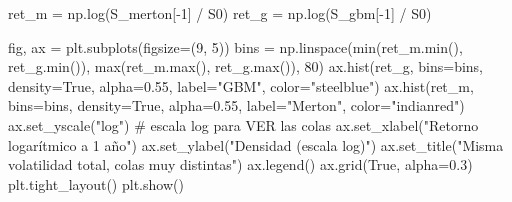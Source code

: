 \documentclass[
  spanish,
  letterpaper,
  DIV=11,
  numbers=noendperiod]{scrreprt}
\newenvironment{Shaded}{\begin{snugshade}}{\end{snugshade}}
\newcommand{\BuiltInTok}[1]{\textcolor[rgb]{0.00,0.23,0.31}{#1}}
\newcommand{\CommentTok}[1]{\textcolor[rgb]{0.37,0.37,0.37}{#1}}
\newcommand{\DecValTok}[1]{\textcolor[rgb]{0.68,0.00,0.00}{#1}}
\newcommand{\FloatTok}[1]{\textcolor[rgb]{0.68,0.00,0.00}{#1}}
\newcommand{\NormalTok}[1]{\textcolor[rgb]{0.00,0.23,0.31}{#1}}
\newcommand{\OperatorTok}[1]{\textcolor[rgb]{0.37,0.37,0.37}{#1}}
\newcommand{\StringTok}[1]{\textcolor[rgb]{0.13,0.47,0.30}{#1}}
\newcommand{\VariableTok}[1]{\textcolor[rgb]{0.07,0.07,0.07}{#1}}
\begin{document}
\begin{Shaded}
\begin{Highlighting}[]
\NormalTok{ret\_m }\OperatorTok{=}\NormalTok{ np.log(S\_merton[}\OperatorTok{{-}}\DecValTok{1}\NormalTok{] }\OperatorTok{/}\NormalTok{ S0)}
\NormalTok{ret\_g }\OperatorTok{=}\NormalTok{ np.log(S\_gbm[}\OperatorTok{{-}}\DecValTok{1}\NormalTok{] }\OperatorTok{/}\NormalTok{ S0)}

\NormalTok{fig, ax }\OperatorTok{=}\NormalTok{ plt.subplots(figsize}\OperatorTok{=}\NormalTok{(}\DecValTok{9}\NormalTok{, }\DecValTok{5}\NormalTok{))}
\NormalTok{bins }\OperatorTok{=}\NormalTok{ np.linspace(}\BuiltInTok{min}\NormalTok{(ret\_m.}\BuiltInTok{min}\NormalTok{(), ret\_g.}\BuiltInTok{min}\NormalTok{()), }\BuiltInTok{max}\NormalTok{(ret\_m.}\BuiltInTok{max}\NormalTok{(), ret\_g.}\BuiltInTok{max}\NormalTok{()), }\DecValTok{80}\NormalTok{)}
\NormalTok{ax.hist(ret\_g, bins}\OperatorTok{=}\NormalTok{bins, density}\OperatorTok{=}\VariableTok{True}\NormalTok{, alpha}\OperatorTok{=}\FloatTok{0.55}\NormalTok{, label}\OperatorTok{=}\StringTok{"GBM"}\NormalTok{, color}\OperatorTok{=}\StringTok{"steelblue"}\NormalTok{)}
\NormalTok{ax.hist(ret\_m, bins}\OperatorTok{=}\NormalTok{bins, density}\OperatorTok{=}\VariableTok{True}\NormalTok{, alpha}\OperatorTok{=}\FloatTok{0.55}\NormalTok{, label}\OperatorTok{=}\StringTok{"Merton"}\NormalTok{, color}\OperatorTok{=}\StringTok{"indianred"}\NormalTok{)}
\NormalTok{ax.set\_yscale(}\StringTok{"log"}\NormalTok{)   }\CommentTok{\# escala log para VER las colas}
\NormalTok{ax.set\_xlabel(}\StringTok{"Retorno logarítmico a 1 año"}\NormalTok{)}
\NormalTok{ax.set\_ylabel(}\StringTok{"Densidad (escala log)"}\NormalTok{)}
\NormalTok{ax.set\_title(}\StringTok{"Misma volatilidad total, colas muy distintas"}\NormalTok{)}
\NormalTok{ax.legend()}
\NormalTok{ax.grid(}\VariableTok{True}\NormalTok{, alpha}\OperatorTok{=}\FloatTok{0.3}\NormalTok{)}
\NormalTok{plt.tight\_layout()}
\NormalTok{plt.show()}


\end{Highlighting}
\end{Shaded}
\end{document}
